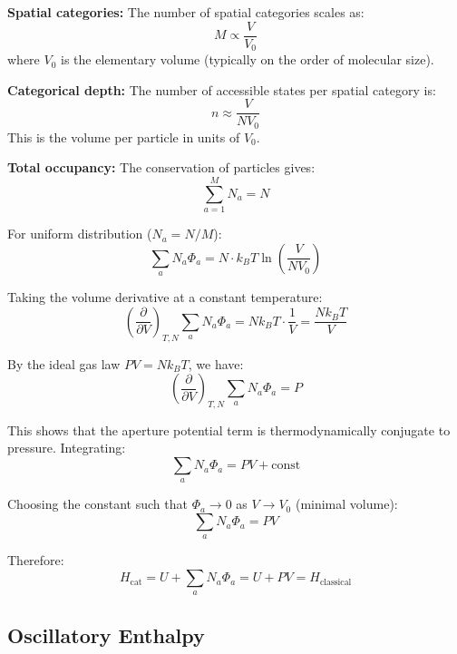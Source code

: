 \textbf{Spatial categories:} The number of spatial categories scales as:
\begin{equation}
M \propto \frac{V}{V_0}
\end{equation}
where $V_0$ is the elementary volume (typically on the order of molecular size).

\textbf{Categorical depth:} The number of accessible states per spatial category is:
\begin{equation}
n \approx \frac{V}{N V_0}
\end{equation}
This is the volume per particle in units of $V_0$.

\textbf{Total occupancy:} The conservation of particles gives:
\begin{equation}
\sum_{a=1}^{M} N_a = N
\end{equation}

For uniform distribution ($N_a = N/M$):
\begin{equation}
\sum_a N_a \Phi_a = N \cdot k_B T \ln\left(\frac{V}{N V_0}\right)
\end{equation}

Taking the volume derivative at a constant temperature:
\begin{equation}
\left(\frac{\partial}{\partial V}\right)_{T,N} \sum_a N_a \Phi_a = N k_B T \cdot \frac{1}{V} = \frac{Nk_B T}{V}
\end{equation}

By the ideal gas law $PV = Nk_B T$, we have:
\begin{equation}
\left(\frac{\partial}{\partial V}\right)_{T,N} \sum_a N_a \Phi_a = P
\end{equation}

This shows that the aperture potential term is thermodynamically conjugate to pressure. Integrating:
\begin{equation}
\sum_a N_a \Phi_a = PV + \text{const}
\end{equation}

Choosing the constant such that $\Phi_a \to 0$ as $V \to V_0$ (minimal volume):
\begin{equation}
\sum_a N_a \Phi_a = PV
\end{equation}

Therefore:
\begin{equation}
H_{\text{cat}} = U + \sum_a N_a \Phi_a = U + PV = H_{\text{classical}}
\end{equation}

\subsection{Oscillatory Enthalpy}

